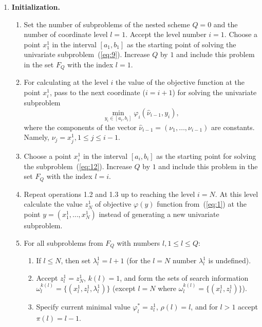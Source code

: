 \documentclass[smallextended]{svjour3}
\let\origref\ref
\renewcommand{\ref}[1]{(\origref{#1})}
\begin{document}
\begin{enumerate}[label=\bfseries Step \arabic*., leftmargin=*]
  \item \textbf{Initialization.}
  \begin{enumerate}[label=\arabic{enumi}.\arabic*., leftmargin=-2em]
    \item Set the number of subproblems of the nested scheme $Q = 0$ and the number of coordinate level $l = 1$. Accept the level number $i = 1$. Choose a point $x_1^1$ in the interval $[a_1, b_1]$ as the starting point of solving the univariate subproblem~\ref{eq:9}. Increase $Q$ by $1$ and include this problem in the set $F_Q$ with the index $l = 1$.

    \item For calculating at the level $i$ the value of the objective function at the point $x_i^1$, pass to the next coordinate ($i = i + 1$) for solving the univariate subproblem
    \begin{equation}
      \label{eq:12}
      \min_{y_i \in [a_i, b_i]} \varphi_i(\hat{\nu}_{i - 1}, y_i),
    \end{equation}
    where the components of the vector $\hat{\nu}_{i - 1} = (\nu_1, \dots, \nu_{i - 1})$ are constants. Namely, $\nu_j = x_j^1, 1 \leq j \leq i - 1$.

    \item Choose a point $x_i^1$ in the interval $[a_i, b_i]$ as the starting point for solving the subproblem~\ref{eq:12}. Increase $Q$ by $1$ and include this problem in the set $F_Q$ with the index $l = i$.

    \item Repeat operations 1.2 and 1.3 up to reaching the level $i = N$. At this level calculate the value $z_N^1$ of objective $\varphi(y)$ function from~\ref{eq:1} at the point $y = (x_1^1, \dots, x_N^1)$ instead of generating a new univariate subproblem.

    \item For all subproblems from $F_Q$ with numbers $l, 1 \leq l \leq Q$:
    \begin{enumerate}[label=\arabic{enumi}.\arabic{enumii}.\arabic*., leftmargin=*]
      \item If $l \leq N$, then set $\lambda_l^1 = l + 1$ (for the $l = N$ number $\lambda_l^1$ is undefined).
      \item Accept $z_l^1 = z_N^1$, $k(l) = 1$, and form the sets of search information $\omega_l^{k(l)} = \{( x_l^1, z_l^1, \lambda_l^1 )\}$ (except $l = N$ where $\omega_l^{k(l)} = \{( x_l^1, z_l^1 )\}$).
      \item Specify current minimal value $\varphi_l^* = z_l^1$, $\rho(l) = l$, and for $l > 1$ accept $\pi(l) = l - 1$.
    \end{enumerate}
  \end{enumerate}


\end{enumerate}
\end{document}
